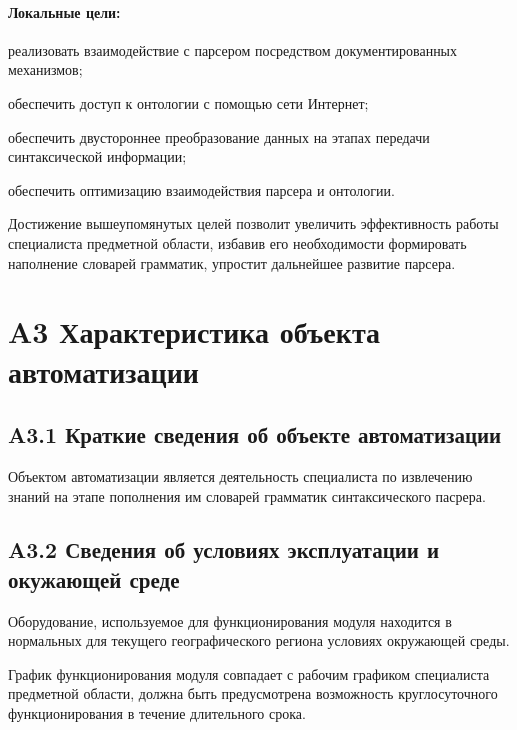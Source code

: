 \paragraph{Локальные цели:}
\begin{list}{}{\leftmargin=1.5cm}
  \item реализовать взаимодействие с парсером посредством документированных механизмов;
  \item обеспечить доступ к онтологии с помощью сети Интернет;
  \item обеспечить двустороннее преобразование данных на этапах передачи синтаксической информации;
  \item обеспечить оптимизацию взаимодействия парсера и онтологии.
\end{list}

Достижение вышеупомянутых целей позволит увеличить эффективность работы специалиста предметной области, избавив его необходимости формировать наполнение словарей грамматик, упростит дальнейшее развитие парсера.

\section*{A3 Характеристика объекта автоматизации}
\subsection*{A3.1 Краткие сведения об объекте автоматизации}
Объектом автоматизации является деятельность специалиста по извлечению знаний на этапе пополнения им словарей грамматик синтаксического пасрера.

\subsection*{A3.2 Сведения об условиях эксплуатации и окужающей среде}
Оборудование, используемое для функционирования модуля находится в нормальных для текущего географического
региона условиях окружающей среды.

График функционирования модуля совпадает с рабочим графиком специалиста предметной области, должна быть предусмотрена возможность круглосуточного функционирования в течение длительного срока.

